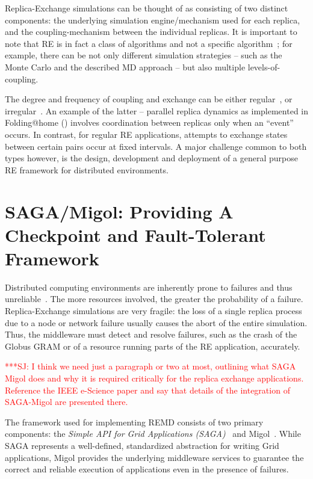 \documentclass{rspublic}
\newcommand{\jhanote}[1]{ {\textcolor{red} { ***SJ: #1 }}}
\newcommand{\jhanote}[1]{}
\begin{document}
Replica-Exchange simulations can be thought of as consisting of
two distinct components: the underlying simulation engine/mechanism
used for each replica, and the coupling-mechanism between the
individual replicas.  It is important to note that RE is in fact a
class of algorithms and not a specific
algorithm~\citep{dpa-paper}; for example, there can be not only
different simulation strategies -- such as the Monte Carlo and the
described MD approach -- but also multiple levels-of-coupling.  


The degree and frequency of coupling and exchange can be either
regular~\citep{hansmann,Sugita:1999rm}, or
irregular~\citep{SPdynamics,pande_bj03}. An example of the latter --
parallel replica dynamics as implemented in Folding@home
(\citep{folding}) involves coordination between replicas only when an
``event'' occurs.  In contrast, for regular RE applications, attempts
to exchange states between certain pairs occur at fixed intervals. A
major challenge common to both types however, is the design,
development and deployment of a general purpose RE framework for
distributed environments.



\section{SAGA/Migol: Providing A Checkpoint and Fault-Tolerant
  Framework}\label{sec:sagamigol}


Distributed computing environments are inherently prone to failures
and thus
unreliable~\citep{schroeder,10.1109/E-SCIENCE.2006.93,DBLP:conf/grid/KhaliliHOSC06}. The
more resources involved, the greater the probability of a failure.
Replica-Exchange simulations are very fragile: the loss of a single
replica process due to a node or network failure usually causes the
abort of the entire simulation. Thus, the middleware must detect and
resolve failures, such as the crash of the Globus GRAM or of a
resource running parts of the RE application, accurately.


\jhanote{I think we need just a paragraph or two at most, outlining
  what SAGA Migol does and why it is required critically for the
  replica exchange applications. Reference the IEEE e-Science paper
  and say that details of the integration of SAGA-Migol are presented
  there.}

The framework used for implementing REMD consists of two primary
components: the \textit{Simple API for Grid Applications
  (SAGA)}~\citep{saga_gfd90} and Migol~\citep{schnorLuckow08}.  While
SAGA represents a well-defined, standardized abstraction for writing
Grid applications, Migol provides the underlying middleware services
to guarantee the correct and reliable exe\-cution of applications even
in the presence of failures.
    
\end{document}
